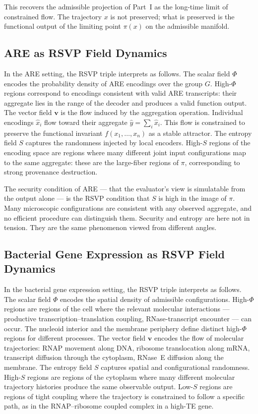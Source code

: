 \documentclass[12pt, a4paper]{article}
\theoremstyle{essaystyle}
\begin{document}
This recovers the admissible projection of Part~I as the long-time limit of constrained
flow. The trajectory $x$ is not preserved; what is preserved is the functional output
of the limiting point $\pi(x)$ on the admissible manifold.

\subsection{ARE as RSVP Field Dynamics}

In the ARE setting, the RSVP triple interprets as follows. The scalar field $\Phi$
encodes the probability density of ARE encodings over the group $G$. High-$\Phi$
regions correspond to encodings consistent with valid ARE transcripts: their aggregate
lies in the range of the decoder and produces a valid function output. The vector field
$\mathbf{v}$ is the flow induced by the aggregation operation. Individual encodings
$\hat{x}_i$ flow toward their aggregate $\hat{y} = \sum_i \hat{x}_i$. This flow is
constrained to preserve the functional invariant $f(x_1, \ldots, x_n)$ as a stable
attractor. The entropy field $S$ captures the randomness injected by local encoders.
High-$S$ regions of the encoding space are regions where many different joint input
configurations map to the same aggregate: these are the large-fiber regions of $\pi$,
corresponding to strong provenance destruction.

The security condition of ARE --- that the evaluator's view is simulatable from the
output alone --- is the RSVP condition that $S$ is high in the image of $\pi$. Many
microscopic configurations are consistent with any observed aggregate, and no efficient
procedure can distinguish them. Security and entropy are here not in tension. They are
the same phenomenon viewed from different angles.

\subsection{Bacterial Gene Expression as RSVP Field Dynamics}

In the bacterial gene expression setting, the RSVP triple interprets as follows. The
scalar field $\Phi$ encodes the spatial density of admissible configurations. High-$\Phi$
regions are regions of the cell where the relevant molecular interactions --- productive
transcription--translation coupling, RNase-transcript encounter --- can occur. The
nucleoid interior and the membrane periphery define distinct high-$\Phi$ regions for
different processes. The vector field $\mathbf{v}$ encodes the flow of molecular
trajectories: RNAP movement along DNA, ribosome translocation along mRNA, transcript
diffusion through the cytoplasm, RNase~E diffusion along the membrane. The entropy
field $S$ captures spatial and configurational randomness. High-$S$ regions are regions
of the cytoplasm where many different molecular trajectory histories produce the same
observable output. Low-$S$ regions are regions of tight coupling where the trajectory
is constrained to follow a specific path, as in the RNAP--ribosome coupled complex in
a high-TE gene.
\end{document}
